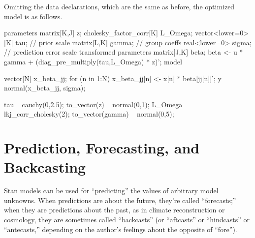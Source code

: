 Omitting the data declarations, which are the same as before, the
optimized model is as follows.
%
\begin{stancode}
parameters {
  matrix[K,J] z;
  cholesky_factor_corr[K] L_Omega;  
  vector<lower=0>[K] tau;      // prior scale
  matrix[L,K] gamma;           // group coeffs
  real<lower=0> sigma;         // prediction error scale
}
transformed parameters {
  matrix[J,K] beta;
  beta <- u * gamma + (diag_pre_multiply(tau,L_Omega) * z)';
}
model {
  vector[N] x_beta_jj;
  for (n in 1:N)
    x_beta_jj[n] <- x[n] * beta[jj[n]]';
  y ~ normal(x_beta_jj, sigma);

  tau ~ cauchy(0,2.5);
  to_vector(z) ~ normal(0,1); 
  L_Omega ~ lkj_corr_cholesky(2);
  to_vector(gamma) ~ normal(0,5);
}
\end{stancode}




\section{Prediction, Forecasting, and Backcasting}

Stan models can be used for ``predicting'' the values of arbitrary
model unknowns.  When predictions are about the future, they're called
``forecasts;'' when they are predictions about the past, as in climate
reconstruction or cosmology, they are sometimes called ``backcasts''
(or ``aftcasts'' or ``hindcasts'' or ``antecasts,'' depending on the
author's feelings about the opposite of ``fore'').

